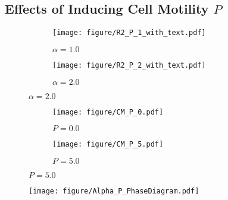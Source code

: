 \documentclass[a4paper,12pt]{article}
\begin{document}
\subsection{Effects of Inducing Cell Motility $P$}

\begin{figure}[h]
\centering
\begin{subfigure}[h]{0.49\textwidth}
\texttt{[image: figure/R2\_P\_1\_with\_text.pdf]}
\caption*{$\alpha = 1.0$}
\end{subfigure}
\begin{subfigure}[h]{0.49\textwidth}
\texttt{[image: figure/R2\_P\_2\_with\_text.pdf]}
\caption*{$\alpha = 2.0$}
\end{subfigure}
\end{figure}

\begin{figure}[h]
\centering
\begin{subfigure}[h]{0.49\textwidth}
\texttt{[image: figure/CM\_P\_0.pdf]}
\caption*{$P = 0.0$}
\end{subfigure}
\begin{subfigure}[h]{0.49\textwidth}
\texttt{[image: figure/CM\_P\_5.pdf]}
\caption*{$P = 5.0$}
\end{subfigure}
\end{figure}
\begin{figure}[h]
\centering
\texttt{[image: figure/Alpha\_P\_PhaseDiagram.pdf]}
\caption{}
\end{figure}
\FloatBarrier
\end{document}

